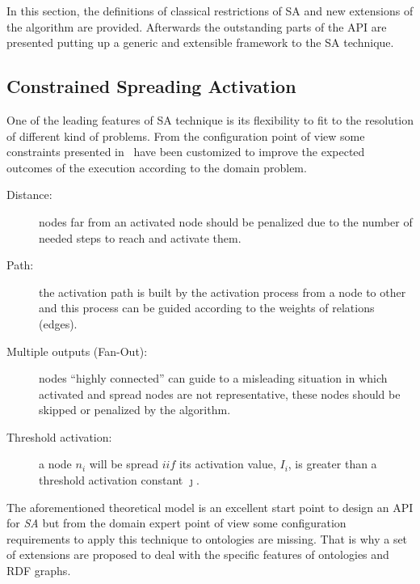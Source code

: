 In this section, the definitions of classical restrictions of SA and new extensions
of the algorithm are provided. Afterwards the outstanding parts of the API are presented 
putting up a generic and extensible framework to the SA technique.

\subsection{Constrained Spreading Activation}
One of the leading features of SA technique is its flexibility to fit to 
the resolution of different kind of problems. From the configuration point of view
some constraints presented in~\cite{Cohen1987} have been customized to improve
the expected outcomes of the execution according to the domain problem. 

\begin{description}

\item [Distance:] nodes far from an activated node should be penalized due to
the number of needed steps to reach and activate them.

\item [Path:] the activation path is built by the activation process from a node
to other and this process can be guided according to the weights of relations (edges). 

\item [Multiple outputs (Fan-Out):] nodes ``highly connected'' can 
guide to a misleading situation in which activated and spread nodes are not representative, these nodes
should be skipped or penalized by the algorithm.

\item [Threshold activation:] a node $n_i$ will be spread $iif$ its activation
value, $I_i$, is greater than a threshold activation constant $\jmath$.

\end{description}

The aforementioned theoretical model is an excellent start point to design
an API for \textit{SA} but from the domain expert point of view some configuration requirements to apply this technique 
to ontologies are missing. That is why a set of extensions are proposed to 
deal with the specific features of ontologies and RDF graphs.

